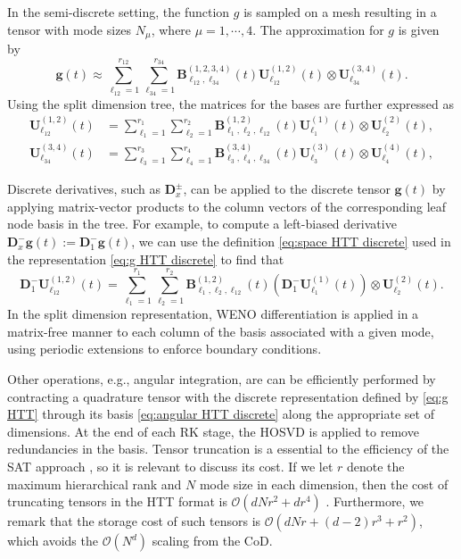 \documentclass[onefignum,onetabnum]{siamart220329}
\begin{document}
In the semi-discrete setting, the function $g$ is sampled on a mesh resulting in a tensor with mode sizes $N_{\mu}$, where $\mu = 1, \cdots, 4$. The approximation for $g$ is given by
\begin{equation}
    \label{eq:g HTT discrete}
    \mathbf{g}(t) \approx \sum_{\ell_{12} = 1}^{r_{12}} \sum_{\ell_{34} = 1}^{r_{34}} \mathbf{B}_{\ell_{12}, \ell_{34}}^{(1,2,3,4)} (t) \mathbf{U}_{\ell_{12}}^{(1,2)} (t) \otimes \mathbf{U}_{\ell_{34}}^{(3,4)} (t).
\end{equation}
Using the split dimension tree, the matrices for the bases are further expressed as
\begin{align}
    \mathbf{U}_{\ell_{12}}^{(1,2)}(t) &= \sum_{\ell_{1}=1}^{r_{1}} \sum_{\ell_{2}=1}^{r_{2}} \mathbf{B}_{\ell_{1},\ell_{2},\ell_{12}}^{(1,2)}(t)  \mathbf{U}_{\ell_{1}}^{(1)} (t) \otimes \mathbf{U}_{\ell_{2}}^{(2)} (t), \label{eq:space HTT discrete} \\ 
    \mathbf{U}_{\ell_{34}}^{(3,4)}(t) &= \sum_{\ell_{3}=1}^{r_{3}} \sum_{\ell_{4}=1}^{r_{4}} \mathbf{B}_{\ell_{3},\ell_{4},\ell_{34}}^{(3,4)} (t)  \mathbf{U}_{\ell_{3}}^{(3)} (t)\otimes \mathbf{U}_{\ell_{4}}^{(4)} (t), \label{eq:angular HTT discrete}
\end{align}

Discrete derivatives, such as $\mathbf{D}_{x}^{\pm}$, can be applied to the discrete tensor $\mathbf{g}(t)$ by applying matrix-vector products to the column vectors of the corresponding leaf node basis in the tree. For example, to compute a left-biased derivative $\mathbf{D}_{x}^{-} \mathbf{g}(t) := \mathbf{D}_{1}^{-} \mathbf{g}(t)$, we can use the definition \eqref{eq:space HTT discrete} used in the representation \eqref{eq:g HTT discrete} to find that
\begin{equation*}
    \mathbf{D}_{1}^{-}  \mathbf{U}_{\ell_{12}}^{(1,2)}(t) = \sum_{\ell_{1}=1}^{r_{1}} \sum_{\ell_{2}=1}^{r_{2}} \mathbf{B}_{\ell_{1},\ell_{2},\ell_{12}}^{(1,2)}(t) \left( \mathbf{D}_{1}^{-} \mathbf{U}_{\ell_{1}}^{(1)} (t) \right) \otimes \mathbf{U}_{\ell_{2}}^{(2)} (t).
\end{equation*}
In the split dimension representation, WENO differentiation is applied in a matrix-free manner to each column of the basis associated with a given mode, using periodic extensions to enforce boundary conditions.

Other operations, e.g., angular integration, are can be efficiently performed by contracting a quadrature tensor with the discrete representation defined by \eqref{eq:g HTT} through its basis \eqref{eq:angular HTT discrete} along the appropriate set of dimensions. At the end of each RK stage, the HOSVD is applied to remove redundancies in the basis. Tensor truncation is a essential to the efficiency of the SAT approach \cite{GuoVlasovFlowMap2022}, so it is relevant to discuss its cost. If we let $r$ denote the maximum hierarchical rank and $N$ mode size in each dimension, then the cost of truncating tensors in the HTT format is $\mathcal{O} \left(dNr^{2} + dr^{4}\right)$ \cite{GrasedyckHTT2010,kressner2012htucker}. Furthermore, we remark that the storage cost of such tensors is $\mathcal{O} \left(dNr + (d-2)r^{3} + r^{2}\right)$, which avoids the $\mathcal{O}(N^{d})$ scaling from the CoD.
\end{document}
